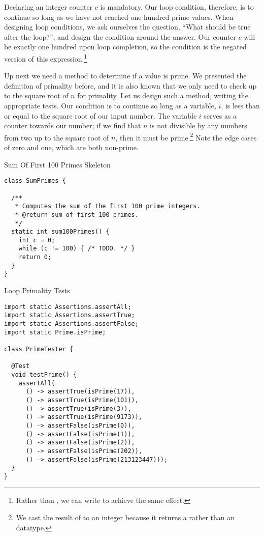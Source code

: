 Declaring an integer counter $c$ is mandatory. Our loop condition, therefore, is to continue so long as we have not reached one hundred prime values. When designing loop conditions, we ask ourselves the question, ``What should be true after the loop?'', and design the condition around the answer. Our counter $c$ will be exactly one hundred upon loop completion, so the condition is the negated version of this expression.\footnote{Rather than , we can write  to achieve the same effect.}

Up next we need a method to determine if a value is prime. We presented the definition of primality before, and it is also known that we only need to check up to the square root of $n$ for primality. Let us design such a method, writing the appropriate tests. Our condition is to continue so long as a variable, $i$, is less than or equal to the square root of our input number. The variable $i$ serves as a counter towards our number; if we find that $n$ is not divisible by any numbers from two up to the square root of $n$, then it must be prime.\footnote{We cast the result of  to an integer because it returns a  rather than an  datatype.} Note the edge cases of zero and one, which are both non-prime.

\begin{cl}{Sum Of First 100 Primes Skeleton}
\begin{lstlisting}[language=MyJava]
class SumPrimes {

  /**
   * Computes the sum of the first 100 prime integers.
   * @return sum of first 100 primes.
   */
  static int sum100Primes() {
    int c = 0;
    while (c != 100) { /* TODO. */ }
    return 0;
  }
}
\end{lstlisting}
\end{cl}

\begin{cl}{Loop Primality Tests}
\begin{lstlisting}[language=MyJava]
import static Assertions.assertAll;
import static Assertions.assertTrue;
import static Assertions.assertFalse;
import static Prime.isPrime;

class PrimeTester {

  @Test
  void testPrime() {
    assertAll(
      () -> assertTrue(isPrime(17)),
      () -> assertTrue(isPrime(101)),
      () -> assertTrue(isPrime(3)),
      () -> assertTrue(isPrime(9173)),
      () -> assertFalse(isPrime(0)),
      () -> assertFalse(isPrime(1)),
      () -> assertFalse(isPrime(2)),
      () -> assertFalse(isPrime(202)),
      () -> assertFalse(isPrime(213123447)));
  }
}
\end{lstlisting}
\end{cl}

